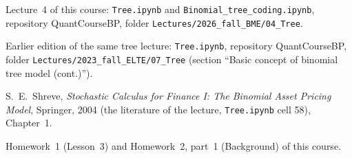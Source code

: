\documentclass[11pt,a4paper]{article}
\newcommand{\subhead}[1]{\par\medskip\noindent{\large\bfseries #1}\par\smallskip\noindent\ignorespaces}
\begin{document}
\subhead{References.}
\begin{enumerate}[label={[\arabic*]}]
\item Lecture~4 of this course: \texttt{Tree.ipynb} and \texttt{Binomial\_tree\_coding.ipynb}, repository QuantCourseBP, folder \texttt{Lectures/2026\_fall\_BME/04\_Tree}.
\item Earlier edition of the same tree lecture: \texttt{Tree.ipynb}, repository QuantCourseBP, folder \texttt{Lectures/2023\_fall\_ELTE/07\_Tree} (section ``Basic concept of binomial tree model (cont.)'').
\item S.~E.~Shreve, \emph{Stochastic Calculus for Finance I: The Binomial Asset Pricing Model}, Springer, 2004 (the literature of the lecture, \texttt{Tree.ipynb} cell 58), Chapter~1.
\item Homework~1 (Lesson~3) and Homework~2, part~1 (Background) of this course.
\end{enumerate}
\end{document}
